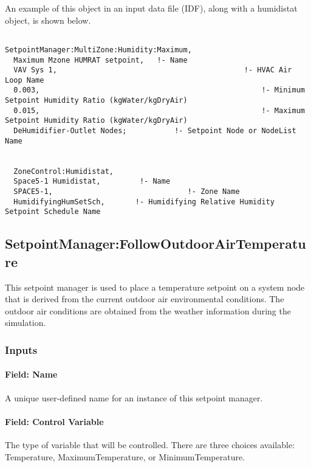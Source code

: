 An example of this object in an input data file (IDF), along with a humidistat object, is shown below.

\begin{lstlisting}

SetpointManager:MultiZone:Humidity:Maximum,
  Maximum Mzone HUMRAT setpoint,   !- Name
  VAV Sys 1,                                           !- HVAC Air Loop Name
  0.003,                                                   !- Minimum Setpoint Humidity Ratio (kgWater/kgDryAir)
  0.015,                                                   !- Maximum Setpoint Humidity Ratio (kgWater/kgDryAir)
  DeHumidifier-Outlet Nodes;           !- Setpoint Node or NodeList Name


  ZoneControl:Humidistat,
  Space5-1 Humidistat,         !- Name
  SPACE5-1,                               !- Zone Name
  HumidifyingHumSetSch,       !- Humidifying Relative Humidity Setpoint Schedule Name
\end{lstlisting}

\subsection{SetpointManager:FollowOutdoorAirTemperature}\label{setpointmanagerfollowoutdoorairtemperature}

This setpoint manager is used to place a temperature setpoint on a system node that is derived from the current outdoor air environmental conditions. The outdoor air conditions are obtained from the weather information during the simulation.

\subsubsection{Inputs}\label{inputs-20-005}

\paragraph{Field: Name}\label{field-name-20-002}

A unique user-defined name for an instance of this setpoint manager.

\paragraph{Field: Control Variable}\label{field-control-variable-14}

The type of variable that will be controlled. There are three choices available: Temperature, MaximumTemperature, or MinimumTemperature.


